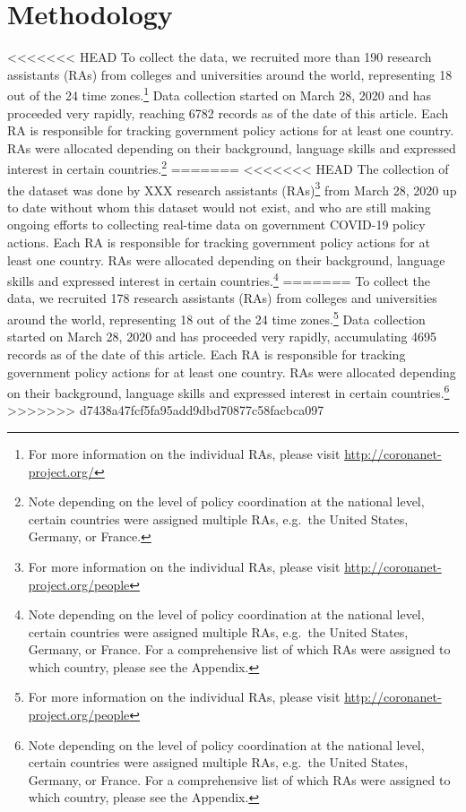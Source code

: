 \documentclass[]{article}
\let\rmarkdownfootnote\footnote%
\def\footnote{\protect\rmarkdownfootnote}
\begin{document}
\hypertarget{methodology}{%
\section{Methodology}\label{methodology}}

<<<<<<< HEAD
To collect the data, we recruited more than 190 research assistants (RAs) from colleges and universities around the world, representing 18 out of the 24 time zones.\footnote{For more information on the individual RAs, please visit \url{http://coronanet-project.org/}} Data collection started on March 28, 2020 and has proceeded very rapidly, reaching 6782 records as of the date of this article. Each RA is responsible for tracking government policy actions for at least one country. RAs were allocated depending on their background, language skills and expressed interest in certain countries.\footnote{Note depending on the level of policy coordination at the national level, certain countries were assigned multiple RAs, e.g.~the United States, Germany, or France.}
=======
<<<<<<< HEAD
The collection of the dataset was done by XXX research assistants (RAs)\footnote{For more information on the individual RAs, please visit \url{http://coronanet-project.org/people} } from March 28, 2020 up to date without whom this dataset would not exist, and who are still making ongoing efforts to collecting real-time data on government COVID-19 policy actions. Each RA is responsible for tracking government policy actions for at least one country. RAs were allocated depending on their background, language skills and expressed interest in certain countries.\footnote{Note depending on the level of policy coordination at the national level, certain countries were assigned multiple RAs, e.g.~the United States, Germany, or France. For a comprehensive list of which RAs were assigned to which country, please see the Appendix.}
=======
To collect the data, we recruited 178 research assistants (RAs) from colleges and universities around the world, representing 18 out of the 24 time zones.\footnote{For more information on the individual RAs, please visit \url{http://coronanet-project.org/people}} Data collection started on March 28, 2020 and has proceeded very rapidly, accumulating 4695 records as of the date of this article. Each RA is responsible for tracking government policy actions for at least one country. RAs were allocated depending on their background, language skills and expressed interest in certain countries.\footnote{Note depending on the level of policy coordination at the national level, certain countries were assigned multiple RAs, e.g.~the United States, Germany, or France. For a comprehensive list of which RAs were assigned to which country, please see the Appendix.}
>>>>>>> d7438a47fcf5fa95add9dbd70877c58facbca097
\end{document}

